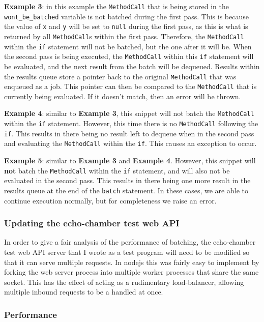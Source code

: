 \textbf{Example 3}: in this example the \verb|MethodCall| that is being stored in the \verb|wont_be_batched| variable is not batched during the first pass. This is because the value of \verb|x| and \verb|y| will be set to \verb|null| during the first pass, as this is what is returned by all \verb|MethodCall|s within the first pass. Therefore, the \verb|MethodCall| within the \verb|if| statement will not be batched, but the one after it will be. When the second pass is being executed, the \verb|MethodCall| within this \verb|if| statement will be evaluated, and the next result from the batch will be dequeued. Results within the results queue store a pointer back to the original \verb|MethodCall| that was enqueued as a job. This pointer can then be compared to the \verb|MethodCall| that is currently being evaluated. If it doesn't match, then an error will be thrown.

\textbf{Example 4}: similar to \textbf{Example 3}, this snippet will not batch the \verb|MethodCall| within the \verb|if| statement. However, this time there is no \verb|MethodCall| following the \verb|if|. This results in there being no result left to dequeue when in the second pass and evaluating the \verb|MethodCall| within the \verb|if|. This causes an exception to occur.

\textbf{Example 5}: similar to \textbf{Example 3} and \textbf{Example 4}. However, this snippet will \textbf{not} batch the \verb|MethodCall| within the \verb|if| statement, and will also not be evaluated in the second pass. This results in there being one more result in the results queue at the end of the \verb|batch| statement. In these cases, we are able to continue execution normally, but for completeness we raise an error.

\subsubsection{Updating the echo-chamber test web API}

In order to give a fair analysis of the performance of batching, the echo-chamber test web API server that I wrote as a test program will need to be modified so that it can serve multiple requests. In nodejs this was fairly easy to implement by forking the web server process into multiple worker processes that share the same socket. This has the effect of acting as a rudimentary load-balancer, allowing multiple inbound requests to be a handled at once.

\subsubsection{Performance}

